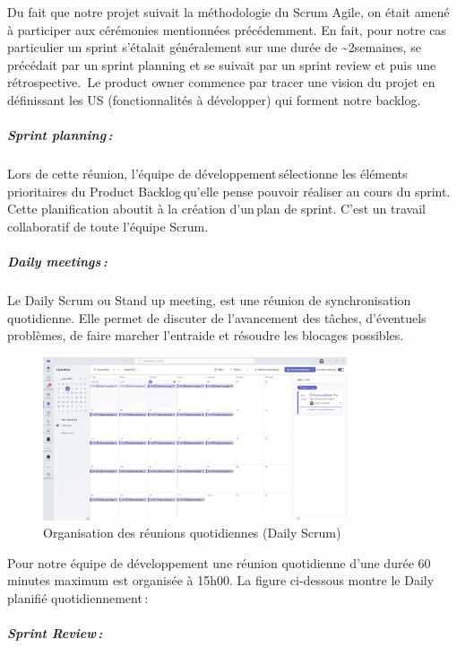 \documentclass[12pt,a4paper,twoside]{report}
\begin{document}
Du fait que notre projet suivait la méthodologie du Scrum Agile, on était amené à participer aux cérémonies mentionnées précédemment. En
fait, pour notre cas particulier un sprint s'étalait généralement sur
une durée de \textasciitilde2semaines, se précédait par un sprint
planning et se suivait par un sprint review et puis une
rétrospective.~Le product owner commence par tracer une vision du projet
en définissant les US (fonctionnalités à développer) qui forment notre
backlog.~~

\hypertarget{sprint-planning}{%
\subparagraph{Sprint planning\,:}\label{sprint-planning}}

Lors de cette réunion, l'équipe de développement\,sélectionne les
éléments prioritaires du Product Backlog\,qu'elle pense pouvoir réaliser
au cours du sprint. Cette planification aboutit à la création d'un\,plan
de sprint. C'est un travail collaboratif de toute l'équipe Scrum.~~

\hypertarget{daily-meetings}{%
\subparagraph{Daily meetings\,:}\label{daily-meetings}}

Le Daily Scrum ou Stand up meeting, est une réunion de synchronisation
quotidienne. Elle permet de discuter de l'avancement des tâches,
d'éventuels problèmes, de faire marcher l'entraide et résoudre les
blocages possibles.

\begin{figure}[H]
\centering
\includegraphics[width=0.8\textwidth]{latex_media/media/image9.png}
\caption{Organisation des réunions quotidiennes (Daily Scrum)}
\label{fig:daily-scrum}
\end{figure}

Pour
notre équipe de développement une réunion quotidienne d'une durée 60
minutes maximum est organisée à 15h00. La figure ci-dessous montre le
Daily planifié quotidiennement\,:~

\hypertarget{sprint-review}{%
\subparagraph{Sprint Review\,:}\label{sprint-review}}
\end{document}
